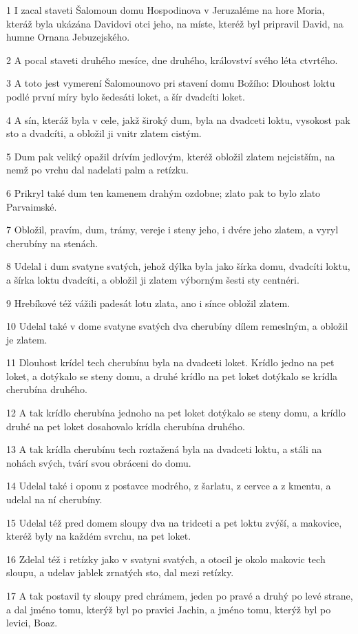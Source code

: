 \par 1 I zacal staveti Šalomoun domu Hospodinova v Jeruzaléme na hore Moria, kteráž byla ukázána Davidovi otci jeho, na míste, kteréž byl pripravil David, na humne Ornana Jebuzejského.
\par 2 A pocal staveti druhého mesíce, dne druhého, království svého léta ctvrtého.
\par 3 A toto jest vymerení Šalomounovo pri stavení domu Božího: Dlouhost loktu podlé první míry bylo šedesáti loket, a šír dvadcíti loket.
\par 4 A sín, kteráž byla v cele, jakž široký dum, byla na dvadceti loktu, vysokost pak sto a dvadcíti, a obložil ji vnitr zlatem cistým.
\par 5 Dum pak veliký opažil drívím jedlovým, kteréž obložil zlatem nejcistším, na nemž po vrchu dal nadelati palm a retízku.
\par 6 Prikryl také dum ten kamenem drahým ozdobne; zlato pak to bylo zlato Parvaimské.
\par 7 Obložil, pravím, dum, trámy, vereje i steny jeho, i dvére jeho zlatem, a vyryl cherubíny na stenách.
\par 8 Udelal i dum svatyne svatých, jehož dýlka byla jako šírka domu, dvadcíti loktu, a šírka loktu dvadcíti, a obložil ji zlatem výborným šesti sty centnéri.
\par 9 Hrebíkové též vážili padesát lotu zlata, ano i sínce obložil zlatem.
\par 10 Udelal také v dome svatyne svatých dva cherubíny dílem remeslným, a obložil je zlatem.
\par 11 Dlouhost krídel tech cherubínu byla na dvadceti loket. Krídlo jedno na pet loket, a dotýkalo se steny domu, a druhé krídlo na pet loket dotýkalo se krídla cherubína druhého.
\par 12 A tak krídlo cherubína jednoho na pet loket dotýkalo se steny domu, a krídlo druhé na pet loket dosahovalo krídla cherubína druhého.
\par 13 A tak krídla cherubínu tech roztažená byla na dvadceti loktu, a stáli na nohách svých, tvárí svou obráceni do domu.
\par 14 Udelal také i oponu z postavce modrého, z šarlatu, z cervce a z kmentu, a udelal na ní cherubíny.
\par 15 Udelal též pred domem sloupy dva na tridceti a pet loktu zvýší, a makovice, kteréž byly na každém svrchu, na pet loket.
\par 16 Zdelal též i retízky jako v svatyni svatých, a otocil je okolo makovic tech sloupu, a udelav jablek zrnatých sto, dal mezi retízky.
\par 17 A tak postavil ty sloupy pred chrámem, jeden po pravé a druhý po levé strane, a dal jméno tomu, kterýž byl po pravici Jachin, a jméno tomu, kterýž byl po levici, Boaz.

